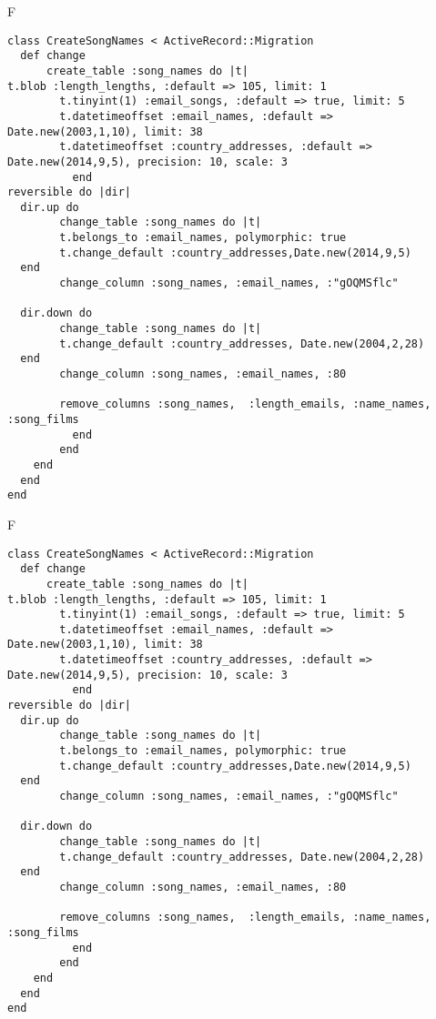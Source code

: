 F
\begin{verbatim}
class CreateSongNames < ActiveRecord::Migration
  def change
	  create_table :song_names do |t|
t.blob :length_lengths, :default => 105, limit: 1
		t.tinyint(1) :email_songs, :default => true, limit: 5
		t.datetimeoffset :email_names, :default => Date.new(2003,1,10), limit: 38
		t.datetimeoffset :country_addresses, :default => Date.new(2014,9,5), precision: 10, scale: 3
		  end
reversible do |dir|
  dir.up do
		change_table :song_names do |t|
		t.belongs_to :email_names, polymorphic: true
 		t.change_default :country_addresses,Date.new(2014,9,5)
  end
 		change_column :song_names, :email_names, :"gOQMSflc"
   
  dir.down do
		change_table :song_names do |t|
		t.change_default :country_addresses, Date.new(2004,2,28)
  end
 		change_column :song_names, :email_names, :80
   
		remove_columns :song_names,  :length_emails, :name_names, :song_films 
	      end
	    end
    end 
  end
end

\end{verbatim}

F
\begin{verbatim}
class CreateSongNames < ActiveRecord::Migration
  def change
	  create_table :song_names do |t|
t.blob :length_lengths, :default => 105, limit: 1
		t.tinyint(1) :email_songs, :default => true, limit: 5
		t.datetimeoffset :email_names, :default => Date.new(2003,1,10), limit: 38
		t.datetimeoffset :country_addresses, :default => Date.new(2014,9,5), precision: 10, scale: 3
		  end
reversible do |dir|
  dir.up do
		change_table :song_names do |t|
		t.belongs_to :email_names, polymorphic: true
 		t.change_default :country_addresses,Date.new(2014,9,5)
  end
 		change_column :song_names, :email_names, :"gOQMSflc"
   
  dir.down do
		change_table :song_names do |t|
		t.change_default :country_addresses, Date.new(2004,2,28)
  end
 		change_column :song_names, :email_names, :80
   
		remove_columns :song_names,  :length_emails, :name_names, :song_films 
	      end
	    end
    end 
  end
end

\end{verbatim}

